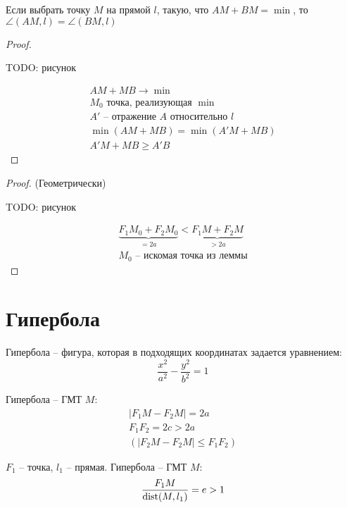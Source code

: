 \begin{lemma} 
    Если выбрать точку $M$ на прямой $l$, такую, что $AM + BM = \min$, то $\angle(AM, l) = \angle(BM, l)$
\end{lemma}

\begin{proof}
    
    \
    
    TODO: рисунок

    
    \begin{gather*}
        AM+MB \to \min\\
        M_0 \text{ точка, реализующая } \min\\
        A' \text{ -- отражение } A \text{ относительно } l\\
        \min(AM+MB) = \min(A'M+MB)\\
        A'M+MB \ge A'B
    \end{gather*}

\end{proof}


\begin{proof} (Геометрически)
    \

    TODO: рисунок


    \begin{gather*}
        \underbrace{F_1M_0 + F_2M_0}_{=2a} < \underbrace{F_1M + F_2M}_{>2a}\\
        M_0 \text{ -- искомая точка из леммы}
    \end{gather*}
\end{proof}

\section{Гипербола}

\begin{definition}
    Гипербола -- фигура, которая в подходящих координатах задается уравнением:
    \[\frac{x^2}{a^2} - \frac{y^2}{b^2}=1\]
\end{definition}
\begin{definition}
    Гипербола -- ГМТ $M:$
    \begin{gather*}
        |F_1 M - F_2M|=2a\\
        F_1 F_2 = 2c > 2a\\
        (|F_2 M - F_2 M| \le F_1 F_2)
    \end{gather*}
\end{definition}
\begin{definition}
    $F_1$ -- точка, $l_1$ -- прямая. Гипербола -- ГМТ $M$:
    \[\frac{F_1 M}{\operatorname{dist}(M,l_1)} = e > 1\]
\end{definition}

